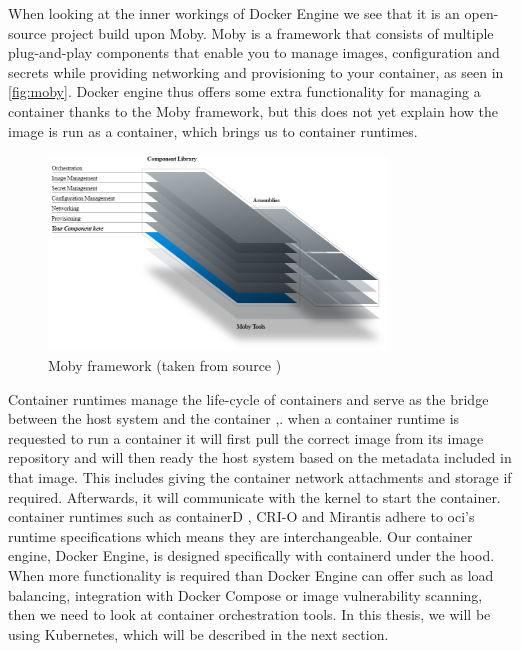 When looking at the inner workings of Docker Engine we see that it is an open-source project build upon Moby\cite{moby}. Moby is a framework that consists of multiple plug-and-play components that enable you to manage images, configuration and secrets while providing networking and provisioning to your container, as seen in \autoref{fig:moby}. Docker engine thus offers some extra functionality for managing a container thanks to the Moby framework, but this does not yet explain how the image is run as a container, which brings us to container runtimes.
\\[10pt]

\begin{figure}[htbp]
  \centering
  \includegraphics[width=0.8\textwidth]{images/moby.png} 
  \caption{Moby framework (taken from source \cite{moby})}
  \label{fig:moby}
\end{figure}

 Container runtimes manage the life-cycle of containers and serve as the bridge between the host system and the container \cite{containerterminology},\cite{contruntime}. when a container runtime is requested to run a container it will first pull the correct image from its image repository and will then ready the host system based on the metadata included in that image. This includes giving the container network attachments and storage if required. Afterwards, it will communicate with the kernel to start the container. container runtimes such as containerD \cite{containerd}, CRI-O \cite{crio} and Mirantis \cite{mirantis} adhere to \acrshort{oci}'s runtime specifications which means they are interchangeable. Our container engine, Docker Engine, is designed specifically with containerd under the hood.
\\[10pt]

When more functionality is required than Docker Engine can offer such as load balancing, integration with Docker Compose or image vulnerability scanning, then we need to look at container orchestration tools. In this thesis, we will be using Kubernetes, which will be described in the next section.
\\[10pt]



